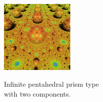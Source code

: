 \begin{figure}[h!tbp]
\begin{minipage}[t]{0.5\textwidth}
\begin{minipage}[t]{0.24\textwidth}
  \end{minipage}
  \hspace*{\fill}
  \begin{minipage}[t]{0.24\textwidth}
   \centering
   \includegraphics[width=1.4in, height=1.4in, keepaspectratio]{./img/application/sphairahedron/variations/pentahedralPrism/glowPrismLimit.jpg}
   \label{fig:semi-prism-glow-limit}
  \end{minipage}
  \hspace*{\fill}
  \caption{Infinite pentahedral prism type \\with two components.}
  \label{fig:semi-sphaira-glow}
 \end{minipage}
\end{figure}

